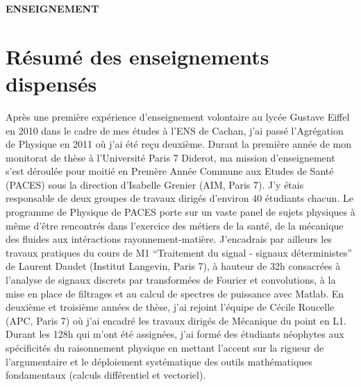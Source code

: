 \documentclass[11pt,onecolumn]{article}
\title{	
\vspace*{-2.5cm}
}
\author{\tiny} %
\date{\tiny }%
\begin{document}


\renewcommand{\headrulewidth}{1pt}
\pagestyle{fancy}
\fancyhf{}
\rfoot{\thepage / \pageref{LastPage}}
\begin{center}
\Large \textbf{ENSEIGNEMENT}
\end{center}
\normalfont
\vspace*{-0.6cm}

\section{Résumé des enseignements dispensés}

Après une première expérience d’enseignement volontaire au lycée Gustave Eiffel en 2010 dans le cadre de mes études à l’ENS de Cachan, j’ai passé l’Agrégation de Physique en 2011 où j’ai été reçu deuxième. Durant la première année de mon monitorat de thèse à l’Université Paris 7 Diderot, ma mission d’enseignement s’est déroulée pour moitié en Premère Année Commune aux Etudes de Santé (PACES) sous la direction d’Isabelle Grenier (AIM, Paris 7). J’y étais responsable de deux groupes de travaux dirigés d’environ 40 étudiants chacun. Le programme de Physique de PACES porte sur un vaste panel de sujets physiques à même d’être rencontrés dans l’exercice des métiers de la santé, de la mécanique des fluides aux intéractions rayonnement-matière. J’encadrais par ailleurs les travaux pratiques du cours de M1 “Traitement du signal - signaux déterministes” de Laurent Daudet (Institut Langevin, Paris 7), à hauteur de 32h consacrées à l’analyse de signaux discrets par transformées de Fourier et convolutions, à la mise en place de filtrages et au calcul de spectres de puissance avec Matlab. En deuxième et troisième années de thèse, j’ai rejoint l’équipe de Cécile Roucelle (APC, Paris 7) où j’ai encadré les travaux dirigés de Mécanique du point en L1. Durant les 128h qui m’ont été assignées, j’ai formé des étudiants néophytes aux spécificités du raisonnement physique en mettant l’accent sur la rigueur de l’argumentaire et le déploiement systématique des outils mathématiques fondamentaux (calculs différentiel et vectoriel).
\end{document}
